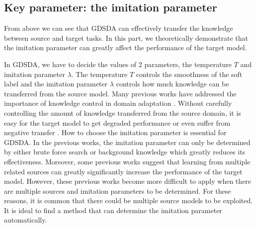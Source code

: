 \subsection{Key parameter: the imitation parameter}\label{sec:key}
From above we can see that GDSDA can effectively transfer the knowledge between source and target tasks. In this part, we theoretically demonstrate that the imitation parameter can greatly affect the performance of the target model.

In GDSDA, we have to decide the values of 2 parameters, the temperature $T$ and imitation parameter $\lambda$. The temperature $T$ controls the smoothness of the soft label and the imitation parameter $\lambda$ controls how much knowledge can be transferred from the source model. Many previous works have addressed the importance of knowledge control in domain adaptation \cite{duan2012learning,duan2012visual}. Without carefully controlling the amount of knowledge transferred from the source domain, it is easy for the target model to get degraded performance or even suffer from negative transfer \cite{pan2010survey}.
How to choose the imitation parameter is essential for GDSDA. In the previous works, the imitation parameter can only be determined by either brute force search \cite{lopez2015unifying} or background knowledge \cite{Tzeng_2015_ICCV} which greatly reduces its effectiveness. Moreover, some previous works \cite{tommasi2014learning} suggest that learning from multiple related sources can greatly significantly increase the performance of the target model.
However, these previous works become more difficult to apply when there are multiple sources and imitation parameters to be determined.
For these reasons, it is common that there could be multiple source models to be exploited. It is ideal to find a method that can determine the imitation parameter automatically.



